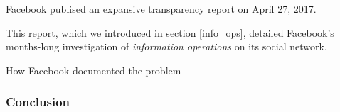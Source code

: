 
\par Facebook publised an expansive transparency report on April 27, 2017.
\par This report, which we introduced in section \ref{info_ops}, detailed Facebook's months-long investigation of \emph{information operations} on its social network. 

\par How Facebook documented the problem

\subsubsection{Conclusion}